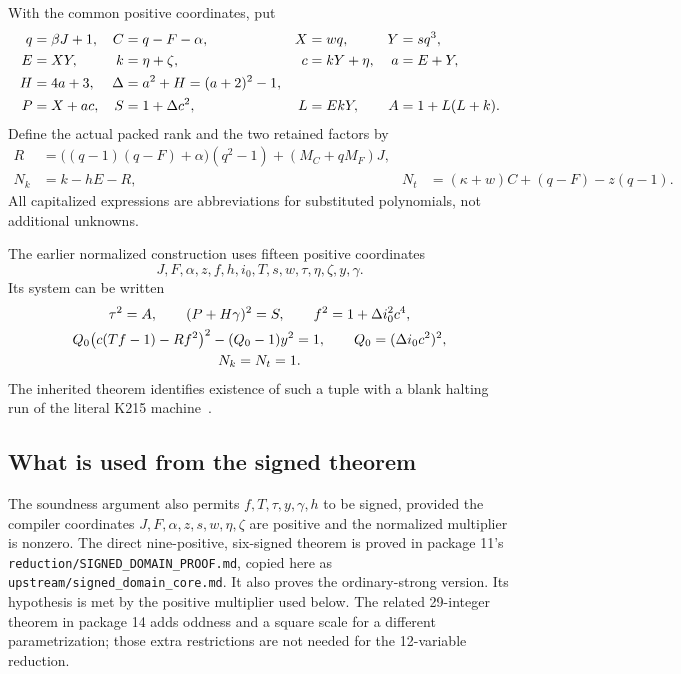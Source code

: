 \documentclass[11pt]{article}
\newcommand{\src}[1]{\nolinkurl{#1}}
\theoremstyle{remark}\newtheorem{remark}[theorem]{Remark}
\begin{document}
With the common positive coordinates, put
\begin{align}
q&=\beta J+1,& C&=q-F-\alpha,& X&=wq,&Y&=sq^3,\notag\\
E&=XY,& k&=\eta+\zeta,&c&=kY+\eta,&a&=E+Y,\notag\\
H&=4a+3,&\Delta&=a^2+H=(a+2)^2-1,\label{eq:prefix}\\
P&=X+ac,&S&=1+\Delta c^2,& L&=EkY,&A&=1+L(L+k).
\notag
\end{align}
Define the actual packed rank and the two retained factors by
\begin{align}
 R&=\bigl((q-1)(q-F)+\alpha\bigr)(q^2-1)+(M_C+qM_F)J,
 \label{eq:rank}\\
 N_k&=k-hE-R,&
 N_t&=(\kappa+w)C+(q-F)-z(q-1).\label{eq:units}
\end{align}
All capitalized expressions are abbreviations for substituted polynomials,
not additional unknowns.

The earlier normalized construction uses fifteen positive coordinates
\[
 J,F,\alpha,z,f,h,i_0,T,s,w,\tau,\eta,\zeta,y,\gamma.
\]
Its system can be written
\begin{gather}
 \tau^2=A,\qquad (P+H\gamma)^2=S,\qquad
 f^2=1+\Delta i_0^2c^4,\notag\\
 Q_0\bigl(c(Tf-1)-Rf^2\bigr)^2-(Q_0-1)y^2=1,
 \qquad Q_0=(\Delta i_0c^2)^2,\label{eq:parent}\\
 N_k=N_t=1.\notag
\end{gather}
The inherited theorem identifies existence of such a tuple with a blank
halting run of the literal K215 machine~\cite{blank,rank,signed29}.

\subsection{What is used from the signed theorem}

The soundness argument also permits $f,T,\tau,y,\gamma,h$ to be signed,
provided the compiler coordinates $J,F,\alpha,z,s,w,\eta,\zeta$ are positive
and the normalized multiplier is nonzero. The direct nine-positive, six-signed theorem is proved in package 11's
\src{reduction/SIGNED_DOMAIN_PROOF.md}, copied here as
\src{upstream/signed_domain_core.md}. It also proves the ordinary-strong
version. Its hypothesis is met by the positive multiplier used below.
The related 29-integer theorem in package 14 adds oddness and a square
scale for a different parametrization; those extra restrictions are not
needed for the 12-variable reduction.
\end{document}
